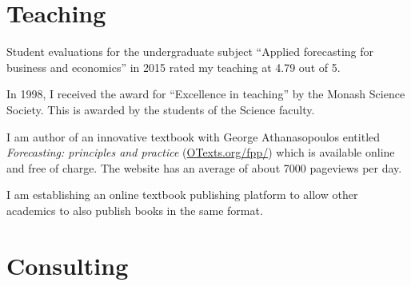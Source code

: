 \documentclass[a4paper,10pt]{article}
\begin{document}
\section{Teaching}

\begin{compactitem}\itemsep=0.1cm
\item %
Student evaluations for the undergraduate subject ``Applied forecasting for business and economics'' in 2015 rated my teaching at 4.79 out of 5.

\item In 1998, I received the award for ``Excellence in teaching'' by the Monash Science Society. This is awarded by the students of the Science faculty.
\item I am author of an innovative textbook with George Athanasopoulos entitled \textit{Forecasting: principles and practice} (\url{OTexts.org/fpp/}) which is available online and free of charge. The website has an average of about 7000 pageviews per day.

\item I am establishing an online textbook publishing platform to allow other academics to also publish books in the same format.

\end{compactitem}

\section{Consulting}
\end{document}

